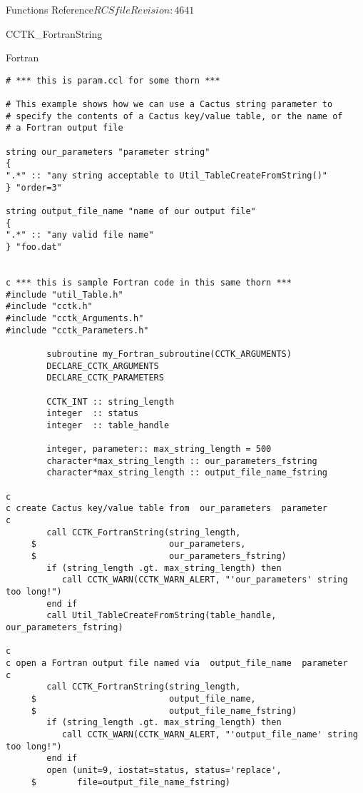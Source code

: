 \begin{cactuspart}{ Functions Reference}{$RCSfile$}{$Revision: 4641 $}
\begin{FunctionDescription}{CCTK\_FortranString}
\begin{ExampleSection}
\begin{Example}{Fortran}
\begin{verbatim}
# *** this is param.ccl for some thorn ***

# This example shows how we can use a Cactus string parameter to
# specify the contents of a Cactus key/value table, or the name of
# a Fortran output file

string our_parameters "parameter string"
{
".*" :: "any string acceptable to Util_TableCreateFromString()"
} "order=3"

string output_file_name "name of our output file"
{
".*" :: "any valid file name"
} "foo.dat"


c *** this is sample Fortran code in this same thorn ***
#include "util_Table.h"
#include "cctk.h"
#include "cctk_Arguments.h"
#include "cctk_Parameters.h"

        subroutine my_Fortran_subroutine(CCTK_ARGUMENTS)
        DECLARE_CCTK_ARGUMENTS
        DECLARE_CCTK_PARAMETERS

        CCTK_INT :: string_length
        integer  :: status
        integer  :: table_handle

        integer, parameter:: max_string_length = 500
        character*max_string_length :: our_parameters_fstring
        character*max_string_length :: output_file_name_fstring

c
c create Cactus key/value table from  our_parameters  parameter
c
        call CCTK_FortranString(string_length,
     $                          our_parameters,
     $                          our_parameters_fstring)
        if (string_length .gt. max_string_length) then
           call CCTK_WARN(CCTK_WARN_ALERT, "'our_parameters' string too long!")
        end if
        call Util_TableCreateFromString(table_handle, our_parameters_fstring)

c
c open a Fortran output file named via  output_file_name  parameter
c
        call CCTK_FortranString(string_length,
     $                          output_file_name,
     $                          output_file_name_fstring)
        if (string_length .gt. max_string_length) then
           call CCTK_WARN(CCTK_WARN_ALERT, "'output_file_name' string too long!")
        end if
        open (unit=9, iostat=status, status='replace',
     $        file=output_file_name_fstring)
\end{verbatim}
\end{Example}
\end{ExampleSection}
\end{FunctionDescription}




\end{cactuspart}
